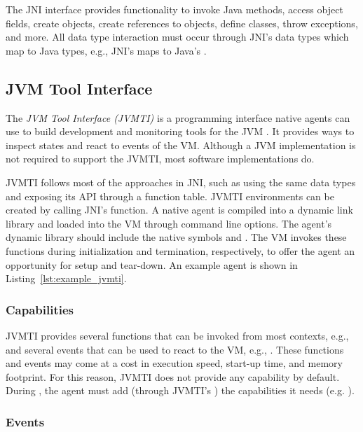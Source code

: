 The JNI interface provides functionality to invoke Java methods, access object fields, create objects, create references to objects, define classes, throw exceptions, and more. All data type interaction must occur through JNI's data types which map to Java types, e.g., JNI's  maps to Java's .

\subsection{JVM Tool Interface}

The \emph{JVM Tool Interface (JVMTI)} is a programming interface native agents can use to build development and monitoring tools for the JVM \cite{jvmti}. It provides ways to inspect states and react to events of the VM. Although a JVM implementation is not required to support the JVMTI, most software implementations do.

JVMTI follows most of the approaches in JNI, such as using the same data types and exposing its API through a function table. JVMTI environments can be created by calling JNI's \href{https://docs.oracle.com/en/java/javase/11/docs/specs/jni/invocation.html#getenv}{} function. A native agent is compiled into a dynamic link library and loaded into the VM through command line options. The agent's dynamic library should include the native symbols  and . The VM invokes these functions during initialization and termination, respectively, to offer the agent an opportunity for setup and tear-down. An example agent is shown in Listing~\ref{lst:example_jvmti}.

\subsubsection*{Capabilities}

JVMTI provides several functions that can be invoked from most contexts, e.g.,  and several events that can be used to react to the VM, e.g., . These functions and events may come at a cost in execution speed, start-up time, and memory footprint. For this reason, JVMTI does not provide any capability by default. During , the agent must add (through JVMTI's ) the capabilities it needs (e.g. ).

\subsubsection*{Events}

